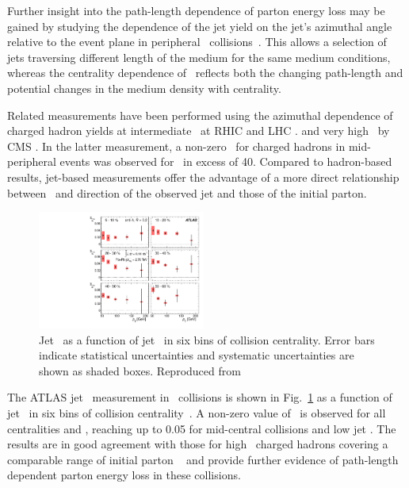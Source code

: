 Further insight into the path-length dependence of parton energy
loss may be gained by studying the dependence of the jet yield
on the jet's azimuthal angle relative to the event plane
in peripheral \PbPb\ collisions~\cite{Aad:2013sla}. This allows a selection of jets
traversing different length of the medium for the same medium
conditions, whereas the centrality dependence of \Rcp\ reflects
both the changing path-length and potential changes in the medium
density with centrality.

Related measurements have been performed using the azimuthal dependence
of charged hadron yields at intermediate \pT\ at RHIC and LHC
\cite{Adams:2004wz,Adler:2006bw,Adare:2010sp, ATLAS:2011ah, Abelev:2012di}.
and very high \pT\ by CMS \cite{Chatrchyan:2012xq}. In the latter 
measurement, a non-zero \vtwo\ for charged hadrons in mid-peripheral 
events was observed for \pT\ in excess of 40\GeVc.
Compared to hadron-based results, jet-based measurements offer the advantage
of a more direct relationship between \pT\ and direction of the observed
jet and those of the initial parton.

\begin{figure}[!th]
\begin{center}
\includegraphics[width=0.49\textwidth]{jetfigures/ATLAS_jetv2.pdf}
\caption{Jet \vtwo\ as a function of jet \pT\ in six bins of 
collision centrality.
Error bars indicate statistical uncertainties and 
systematic uncertainties are shown as shaded boxes. Reproduced from~\cite{Aad:2013sla}}
\label{fig:GR:ATLAS_jet_v2}
\end{center}
\end{figure}

The ATLAS jet \vtwo\ measurement in \PbPb\ collisions 
is shown in Fig.~\ref{fig:GR:ATLAS_jet_v2} as a function of jet \pT\ 
in six bins of collision centrality~\cite{Aad:2013sla}. A non-zero
value of \vtwo\ is observed for all centralities and \pT, reaching up to 0.05 for
mid-central collisions and low jet \pT. The results are in good agreement
with those for high \pT\ charged hadrons covering a comparable range
of initial parton \pT~\cite{Chatrchyan:2012xq} and provide further 
evidence of path-length dependent parton energy loss in these collisions.

